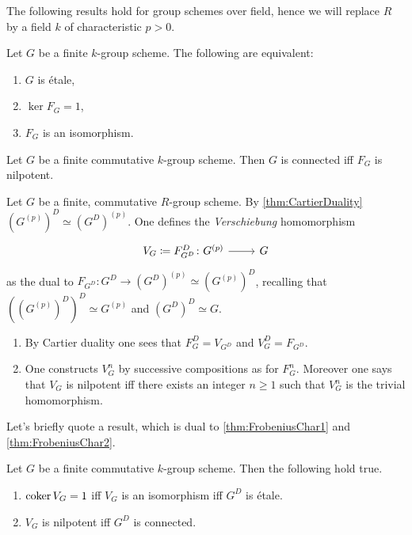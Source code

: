 \noindent
The following results hold for group schemes over field, hence we will replace
$R$ by a field $k$ of characteristic $p > 0$.
\begin{prop}[]\label{thm:FrobeniusChar1}
	Let $G$ be a finite $k$-group scheme.
	The following are equivalent:
\begin{enumerate}
	\item $G$ is étale,
	\item $\ker F_G = 1$,
	\item $F_G$ is an isomorphism.
\end{enumerate}
\end{prop}


\begin{prop}[]\label{thm:FrobeniusChar2}
	Let $G$ be a finite commutative $k$-group scheme.
	Then $G$ is connected iff $F_G$ is nilpotent.
\end{prop}


\begin{defn}[Verschiebung]
	Let $G$ be a finite, commutative $R$-group scheme.
	By \cref{thm:CartierDuality} $(G^{(p)})^D \simeq (G^D)^{(p)}$.
	One defines the {\em Verschiebung} homomorphism
	\begin{equation}
	\begin{tikzcd}[row sep = 0ex
		,/tikz/column 1/.append style={anchor=base east}
		,/tikz/column 2/.append style={anchor=base west}]
		V_G \coloneqq F^D_{G^D}\colon G^{(p)} \arrow[r, "", rightarrow] &
		G
	\end{tikzcd}
	\end{equation} 
	as the dual to $F_{G^D}\colon G^D \to (G^D)^{(p)} \simeq (G^{(p)})^D$,
	recalling that $((G^{(p)})^D)^D \simeq G^{(p)}$ and $(G^D)^D \simeq G$.
\end{defn}


\begin{rem}[]\leavevmode\vspace{-.2\baselineskip}
\begin{enumerate}
\item By Cartier duality one sees that $F^D_G = V_{G^D}$ and
	$V^D_G = F_{G^D}$.
\item One constructs $V^n_G$ by successive compositions as for $F^n_G$.
	Moreover one says that $V_G$ is nilpotent iff there exists an integer $n \geq 1$
	such that $V^n_G$ is the trivial homomorphism.
\end{enumerate}
\end{rem}


\noindent
Let's briefly quote a result, which is dual to
\cref{thm:FrobeniusChar1} and \cref{thm:FrobeniusChar2}.
\begin{prop}[]
	Let $G$ be a finite commutative $k$-group scheme. Then the following hold true.
\begin{enumerate}
	\item $\operatorname{coker} V_G = 1$ iff $V_G$ is an isomorphism iff
		$G^D$ is étale.
	\item $V_G$ is nilpotent iff $G^D$ is connected.
\end{enumerate}
\end{prop}


